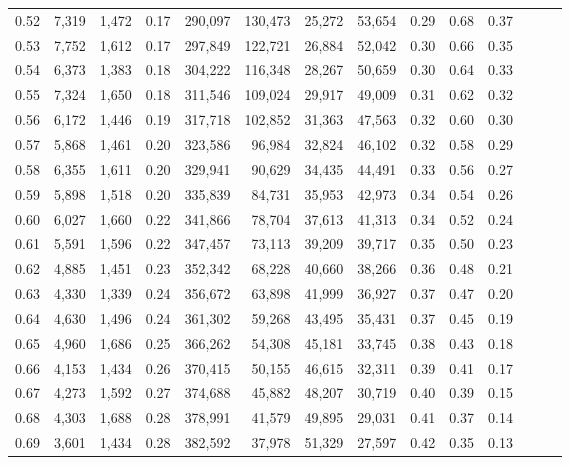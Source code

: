 \begin{tabular}{rrrrrrrrrrrrrr}
0.52 &   7,319 &  1,472 &  0.17 &  290,097 &  130,473 &  25,272 &  53,654 &  0.29 &  0.68 &      0.37 \\
0.53 &   7,752 &  1,612 &  0.17 &  297,849 &  122,721 &  26,884 &  52,042 &  0.30 &  0.66 &      0.35 \\
0.54 &   6,373 &  1,383 &  0.18 &  304,222 &  116,348 &  28,267 &  50,659 &  0.30 &  0.64 &      0.33 \\
0.55 &   7,324 &  1,650 &  0.18 &  311,546 &  109,024 &  29,917 &  49,009 &  0.31 &  0.62 &      0.32 \\
0.56 &   6,172 &  1,446 &  0.19 &  317,718 &  102,852 &  31,363 &  47,563 &  0.32 &  0.60 &      0.30 \\
0.57 &   5,868 &  1,461 &  0.20 &  323,586 &   96,984 &  32,824 &  46,102 &  0.32 &  0.58 &      0.29 \\
0.58 &   6,355 &  1,611 &  0.20 &  329,941 &   90,629 &  34,435 &  44,491 &  0.33 &  0.56 &      0.27 \\
0.59 &   5,898 &  1,518 &  0.20 &  335,839 &   84,731 &  35,953 &  42,973 &  0.34 &  0.54 &      0.26 \\
0.60 &   6,027 &  1,660 &  0.22 &  341,866 &   78,704 &  37,613 &  41,313 &  0.34 &  0.52 &      0.24 \\
0.61 &   5,591 &  1,596 &  0.22 &  347,457 &   73,113 &  39,209 &  39,717 &  0.35 &  0.50 &      0.23 \\
0.62 &   4,885 &  1,451 &  0.23 &  352,342 &   68,228 &  40,660 &  38,266 &  0.36 &  0.48 &      0.21 \\
0.63 &   4,330 &  1,339 &  0.24 &  356,672 &   63,898 &  41,999 &  36,927 &  0.37 &  0.47 &      0.20 \\
0.64 &   4,630 &  1,496 &  0.24 &  361,302 &   59,268 &  43,495 &  35,431 &  0.37 &  0.45 &      0.19 \\
0.65 &   4,960 &  1,686 &  0.25 &  366,262 &   54,308 &  45,181 &  33,745 &  0.38 &  0.43 &      0.18 \\
0.66 &   4,153 &  1,434 &  0.26 &  370,415 &   50,155 &  46,615 &  32,311 &  0.39 &  0.41 &      0.17 \\
0.67 &   4,273 &  1,592 &  0.27 &  374,688 &   45,882 &  48,207 &  30,719 &  0.40 &  0.39 &      0.15 \\
0.68 &   4,303 &  1,688 &  0.28 &  378,991 &   41,579 &  49,895 &  29,031 &  0.41 &  0.37 &      0.14 \\
0.69 &   3,601 &  1,434 &  0.28 &  382,592 &   37,978 &  51,329 &  27,597 &  0.42 &  0.35 &      0.13 \\

\end{tabular}
